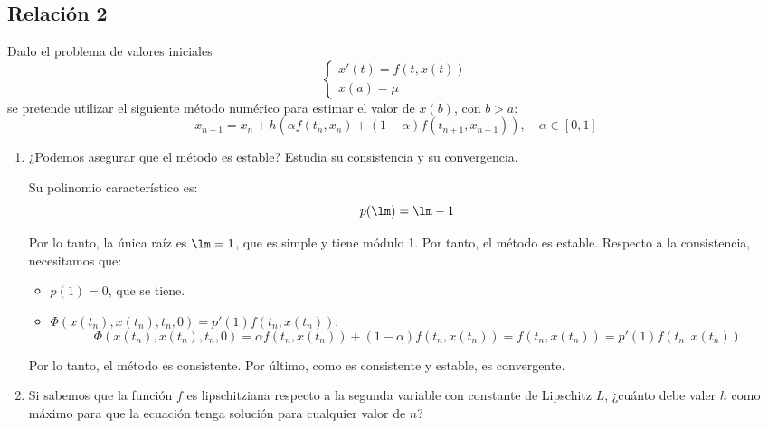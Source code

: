 \subsection{Relación 2}
\setcounter{ejercicio}{0}

\begin{ejercicio}
    Dado el problema de valores iniciales
    \begin{equation*}
        \begin{cases}
            x'(t) = f(t, x(t)) \\
            x(a) = \mu
        \end{cases}
    \end{equation*}
    se pretende utilizar el siguiente método numérico para estimar el valor de $x(b)$, con $b > a$:
    \begin{equation*}
        x_{n+1} = x_n + h \left( \alpha f(t_n, x_n) + (1 - \alpha) f(t_{n+1}, x_{n+1}) \right), \quad \alpha \in [0, 1]
    \end{equation*}
    \begin{enumerate}
        \item ¿Podemos asegurar que el método es estable? Estudia su consistencia y su convergencia.
        
        Su polinomio característico es:
        \begin{equation*}
            p(\lm) = \lm -1
        \end{equation*}

        Por lo tanto, la única raíz es $\lm = 1$, que es simple y tiene módulo 1. Por tanto, el método es estable.
        Respecto a la consistencia, necesitamos que:
        \begin{itemize}
            \item $p(1) = 0$, que se tiene.
            \item $\Phi(x(t_n), x(t_n), t_n, 0) = p'(1)f(t_n, x(t_n))$:
            \begin{equation*}
                \Phi(x(t_n), x(t_n), t_n, 0) = \alpha f(t_n, x(t_n)) + (1 - \alpha) f(t_n, x(t_n))
                = f(t_n, x(t_n)) = p'(1)f(t_n, x(t_n))
            \end{equation*}
        \end{itemize}

        Por lo tanto, el método es consistente. Por último, como es consistente y estable, es convergente.
        \item Si sabemos que la función $f$ es lipschitziana respecto a la segunda variable con constante de Lipschitz $L$, ¿cuánto debe valer $h$ como máximo para que la ecuación tenga solución para cualquier valor de $n$?\\
        

\end{enumerate}
\end{ejercicio}
